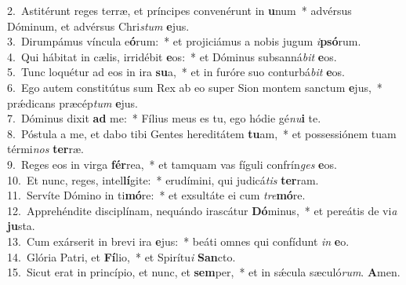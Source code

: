 {2.~}Astitérunt reges terræ, et príncipes convenérunt in \textbf{u}num~* advérsus Dóminum, et advérsus Chri\textit{stum} \textbf{e}jus.\\
{3.~}Dirumpámus víncula e\textbf{ó}rum:~* et projiciámus a nobis jugum \textit{i}\textbf{psó}rum.\\
{4.~}Qui hábitat in cælis, irridébit \textbf{e}os:~* et Dóminus subsanná\textit{bit} \textbf{e}os.\\
{5.~}Tunc loquétur ad eos in ira \textbf{su}a,~* et in furóre suo conturbá\textit{bit} \textbf{e}os.\\
{6.~}Ego autem constitútus sum Rex ab eo super Sion montem sanctum \textbf{e}jus,~* prǽdicans præcép\textit{tum} \textbf{e}jus.\\
{7.~}Dóminus dixit \textbf{ad} me:~* Fílius meus es tu, ego hódie gé\textit{nu}\textbf{i} te.\\
{8.~}Póstula a me, et dabo tibi Gentes hereditátem \textbf{tu}am,~* et possessiónem tuam térmi\textit{nos} \textbf{ter}ræ.\\
{9.~}Reges eos in virga \textbf{fér}rea,~* et tamquam vas fíguli confrín\textit{ges} \textbf{e}os.\\
{10.~}Et nunc, reges, intel\textbf{lí}gite:~* erudímini, qui judicá\textit{tis} \textbf{ter}ram.\\
{11.~}Servíte Dómino in ti\textbf{mó}re:~* et exsultáte ei cum \textit{tre}\textbf{mó}re.\\
{12.~}Apprehéndite disciplínam, nequándo irascátur \textbf{Dó}minus,~* et pereátis de vi\textit{a} \textbf{ju}sta.\\
{13.~}Cum exárserit in brevi ira \textbf{e}jus:~* beáti omnes qui confídunt \textit{in} \textbf{e}o.\\
{14.~}Glória Patri, et \textbf{Fí}lio,~* et Spirítu\textit{i} \textbf{San}cto.\\
{15.~}Sicut erat in princípio, et nunc, et \textbf{sem}per,~* et in sǽcula sæculó\textit{rum}. \textbf{A}men.\\
